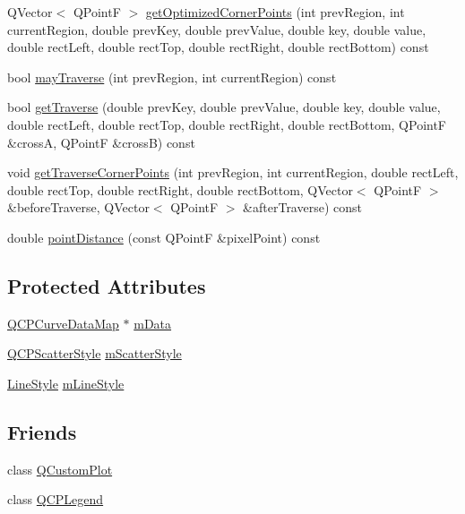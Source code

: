 \begin{DoxyCompactItemize}
Q\+Vector$<$ Q\+PointF $>$ \hyperlink{classQCPCurve_aad0b69d9a7a2a5367fcc9fe3edaf9bf4}{get\+Optimized\+Corner\+Points} (int prev\+Region, int current\+Region, double prev\+Key, double prev\+Value, double key, double value, double rect\+Left, double rect\+Top, double rect\+Right, double rect\+Bottom) const 
\item 
bool \hyperlink{classQCPCurve_ae5b232c8201441a940516c745309a685}{may\+Traverse} (int prev\+Region, int current\+Region) const 
\item 
bool \hyperlink{classQCPCurve_ab4ffdf3d62d5bd3a187f6668daf01f85}{get\+Traverse} (double prev\+Key, double prev\+Value, double key, double value, double rect\+Left, double rect\+Top, double rect\+Right, double rect\+Bottom, Q\+PointF \&crossA, Q\+PointF \&crossB) const 
\item 
void \hyperlink{classQCPCurve_abe1721b19669e7127d76d144660fbeb8}{get\+Traverse\+Corner\+Points} (int prev\+Region, int current\+Region, double rect\+Left, double rect\+Top, double rect\+Right, double rect\+Bottom, Q\+Vector$<$ Q\+PointF $>$ \&before\+Traverse, Q\+Vector$<$ Q\+PointF $>$ \&after\+Traverse) const 
\item 
double \hyperlink{classQCPCurve_acd7a68c6f268ce1ab845eaf69fc2c6a6}{point\+Distance} (const Q\+PointF \&pixel\+Point) const 
\end{DoxyCompactItemize}
\subsection*{Protected Attributes}
\begin{DoxyCompactItemize}
\item 
\hyperlink{qcustomplot_8h_a444d37ec9cb2951b3a7fe443c34d1658}{Q\+C\+P\+Curve\+Data\+Map} $\ast$ \hyperlink{classQCPCurve_a88d533e455bca96004b049e99168731b}{m\+Data}
\item 
\hyperlink{classQCPScatterStyle}{Q\+C\+P\+Scatter\+Style} \hyperlink{classQCPCurve_a08f803b4a30b01bbd7a1eab15d0f864f}{m\+Scatter\+Style}
\item 
\hyperlink{classQCPCurve_a2710e9f79302152cff794c6e16cc01f1}{Line\+Style} \hyperlink{classQCPCurve_ae1f35ae2b15aee8e15bcdfec5be95156}{m\+Line\+Style}
\end{DoxyCompactItemize}
\subsection*{Friends}
\begin{DoxyCompactItemize}
\item 
class \hyperlink{classQCPCurve_a1cdf9df76adcfae45261690aa0ca2198}{Q\+Custom\+Plot}
\item 
class \hyperlink{classQCPCurve_a8429035e7adfbd7f05805a6530ad5e3b}{Q\+C\+P\+Legend}
\end{DoxyCompactItemize}
